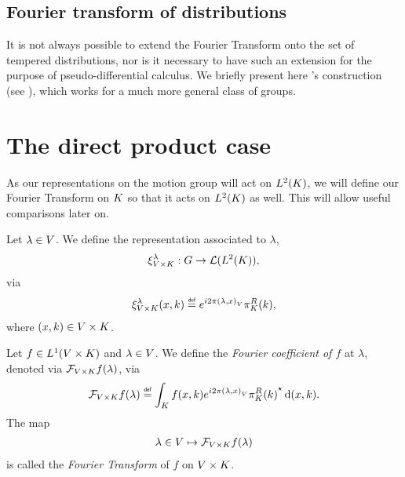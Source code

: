 \subsection{Fourier transform of distributions}

It is not always possible to extend the Fourier Transform onto the set of tempered distributions,
nor is it necessary to have such an extension for the purpose of pseudo-differential calculus.
We briefly present here \citeauthor{FischerRuzhansky16}'s construction (see \cite[Subsection 5.1.2]{FischerRuzhansky16}),
which works for a much more general class of groups.

\section{The direct product case}

As our representations on the motion group will act on $\Lebesgue{2}\CompactGroup$,
we will define our Fourier Transform on $\CompactGroup$ so that it acts on $\Lebesgue{2}\CompactGroup$ as well.
This will allow useful comparisons later on.

\begin{definition}
    Let $\lambda \in \VectorSpace$.
    We define the representation associated to $\lambda$,
    \begin{align*}
        \Rep [\GroupDirect] \lambda : \Group \to \Lin{\Lebesgue 2 \CompactGroup},
    \end{align*}
    via
    \begin{align*}
        \Rep [\GroupDirect] \lambda (x, k) \defeq \e^{\i \turn \ip \lambda x} \RightRegularRepresentation (k),
    \end{align*}
    where $(x, k) \in \GroupDirect$.
\end{definition}

\begin{definition}
    Let $f \in \Lebesgue 1 \GroupDirect$ and $\lambda \in \VectorSpace$.
    We define the \emph{Fourier coefficient of $f$} at $\lambda$,
    denoted via $\Fourier[\GroupDirect] f(\lambda)$, via
    \begin{align*}
        \Fourier [\GroupDirect] f(\lambda) \defeq \int_\CompactGroup f(x, k) \e^{\i \turn \ip \lambda x} \adj{\RightRegularRepresentation(k)} \dd (x, k).
    \end{align*}
    The map
    \begin{align*}
        \lambda \in \VectorSpace \mapsto \Fourier [\GroupDirect] f(\lambda)
    \end{align*}
    is called the \emph{Fourier Transform} of $f$ on $\GroupDirect$.
\end{definition}

